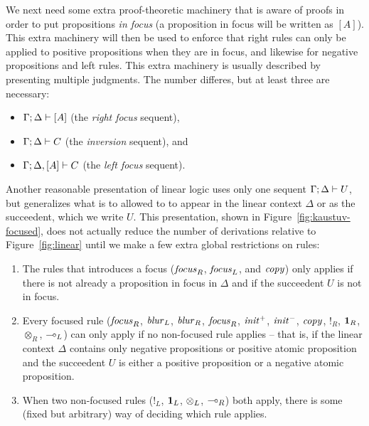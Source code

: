 We next need some extra proof-theoretic machinery that is 
aware of proofs in order to put
propositions {\it in focus} (a proposition in focus will be written as
$[A]$). This extra machinery will then be used to enforce that right
rules can only be applied to positive propositions when they are in
focus, and likewise for negative propositions and left rules.  This
extra machinery is usually described by presenting multiple judgments.
The number differes, but at least three are necessary:

\begin{itemize}
\item ${\Gamma};{\Delta} \vdash [{A}] \mathstrut$ (the {\it right focus} sequent),
\item ${\Gamma};{\Delta} \vdash {C} \mathstrut$ (the {\it inversion} sequent), and
\item ${\Gamma};{\Delta}, [{A}] \vdash {C} \mathstrut$ (the {\it left focus} sequent).
\end{itemize}



Another reasonable presentation of linear logic uses only one sequent
${\Gamma};{\Delta} \vdash {U} \mathstrut$, but generalizes what is to allowed to
to appear in the linear context $\Delta$ or as the succeedent, which
we write $U$.  This presentation, shown in
Figure~\ref{fig:kaustuv-focused}, does not actually reduce the number
of derivations relative to Figure~\ref{fig:linear} until we make a few
extra global restrictions on rules:

\begin{enumerate}
\item The rules that introduces a focus (${\it focus}_R$, ${\it focus}_L$, 
  and ${\it copy}$) only applies if there is not already a proposition 
  in focus in $\Delta$ and if the succeedent $U$ is not in focus. 
\item Every focused rule (${\it focus}_R$, ${\it blur}_L$, ${\it
    blur}_R$, ${\it focus}_R$, ${\it init}^+$, ${\it init}^-$, ${\it
    copy}$, ${!}_R$, ${\mathbf{1}}_R$, ${\otimes}_R$, ${\multimap}_L$) can only
  apply if no non-focused rule applies -- that is, if the
  linear context $\Delta$ contains only negative propositions or positive
  atomic proposition and the succeedent $U$ is either a positive proposition
  or a negative atomic proposition.
\item When two non-focused rules (${!}_L$, ${\mathbf{1}}_L$, ${\otimes}_L$,
  ${\multimap}_R$) both apply, there is some (fixed but arbitrary) way of
  deciding which rule applies.
\end{enumerate}

